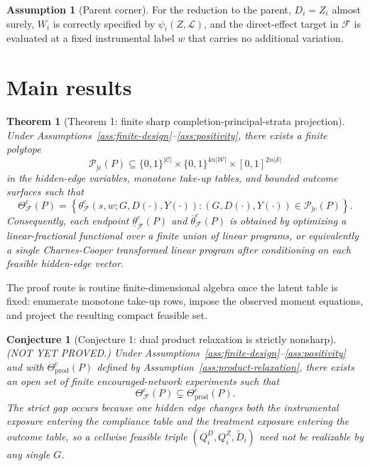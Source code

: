\documentclass[11pt]{article}
\theoremstyle{definition}
\newtheorem{assumption}{Assumption}
\theoremstyle{plain}
\newtheorem{theorem}{Theorem}
\newtheorem{conjecture}{Conjecture}
\theoremstyle{remark}
\begin{document}
\begin{assumption}[Parent corner]\label{ass:parent-corner}
For the reduction to the parent, \(D_i=Z_i\) almost surely, \(W_i\) is correctly specified by \(\psi_i(Z,\mathcal L)\), and the direct-effect target in \(\mathcal F\) is evaluated at a fixed instrumental label \(w\) that carries no additional variation.
\end{assumption}

\section{Main results}
\begin{theorem}[Theorem 1: finite sharp completion-principal-strata projection]\label{thm:joint-polytope}
Under Assumptions~\ref{ass:finite-design}--\ref{ass:positivity}, there exists a finite polytope
\[
\mathcal P_{\mathrm{jc}}(P)
\subseteq
\{0,1\}^{|\mathcal C|}\times
\{0,1\}^{4n|\mathcal W|}\times
[0,1]^{2n|\mathcal S|}
\]
in the hidden-edge variables, monotone take-up tables, and bounded outcome surfaces such that
\[
\Theta^{c}_{\mathcal F}(P)

=
\left\{
\theta^{c}_{\mathcal F}(s,w;G,D(\cdot),Y(\cdot)):
(G,D(\cdot),Y(\cdot))\in\mathcal P_{\mathrm{jc}}(P)
\right\}.
\]
Consequently, each endpoint \(\underline\theta^{c}_{\mathcal F}(P)\) and \(\overline\theta^{c}_{\mathcal F}(P)\) is obtained by optimizing a linear-fractional functional over a finite union of linear programs, or equivalently a single Charnes-Cooper transformed linear program after conditioning on each feasible hidden-edge vector.
\end{theorem}
The proof route is routine finite-dimensional algebra once the latent table is fixed: enumerate monotone take-up rows, impose the observed moment equations, and project the resulting compact feasible set.

\begin{conjecture}[Conjecture 1: dual product relaxation is strictly nonsharp]\label{conj:strict-gap}
(NOT YET PROVED.) Under Assumptions~\ref{ass:finite-design}--\ref{ass:positivity} and with \(\Theta^{c}_{\mathrm{prod}}(P)\) defined by Assumption~\ref{ass:product-relaxation}, there exists an open set of finite encouraged-network experiments such that
\[
\Theta^{c}_{\mathcal F}(P)\subsetneq \Theta^{c}_{\mathrm{prod}}(P).
\]
The strict gap occurs because one hidden edge changes both the instrumental exposure entering the compliance table and the treatment exposure entering the outcome table, so a cellwise feasible triple \((Q_i^D,Q_i^Z,\widetilde D_i)\) need not be realizable by any single \(G\).
\end{conjecture}
\end{document}
